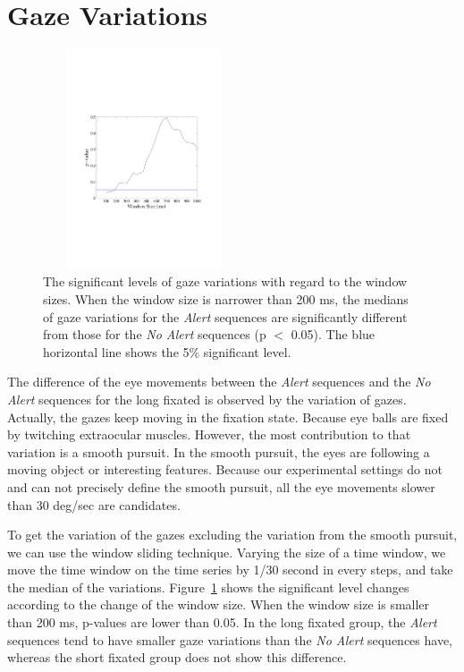\documentclass[oneside,master]{snueethesis}
\begin{document}
\section{Gaze Variations}
\label{subsec:gaze-variations}

\begin{figure}
  \centerline{\includegraphics[width=60mm,height=65mm,trim=48mm 85mm 48mm 86mm]{./eps/gaze_var.pdf}}
  \caption[The significant levels of gaze variations with regard to the window sizes]{The significant levels of gaze variations with regard to the window sizes. When the window size is narrower than 200 ms, the medians of gaze variations for the \textit{Alert} sequences are significantly different from those for the \textit{No Alert} sequences (p $<$ 0.05). The blue horizontal line shows the 5\% significant level.}
  \label{fig:gaze-variation}
\end{figure}

The difference of the eye movements between the \textit{Alert} sequences and the \textit{No Alert} sequences for the long fixated is observed by the variation of gazes. Actually, the gazes keep moving in the fixation state. Because eye balls are fixed by twitching extraocular muscles. However, the most contribution to that variation is a smooth pursuit. In the smooth pursuit, the eyes are following a moving object or interesting features. Because our experimental settings do not and can not precisely define the smooth pursuit, all the eye movements slower than 30 deg/sec are candidates. 

To get the variation of the gazes excluding the variation from the smooth pursuit, we can use the window sliding technique. Varying the size of a time window, we move the time window on the time series by 1/30 second in every steps, and take the median of the variations. Figure~\ref{fig:gaze-variation} shows the significant level changes according to the change of the window size. When the window size is smaller than 200 ms, p-values are lower than 0.05. In the long fixated group, the \textit{Alert} sequences tend to have smaller gaze variations than the \textit{No Alert} sequences have, whereas the short fixated group does not show this difference.
\end{document}
